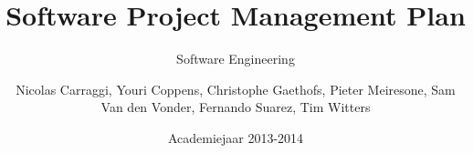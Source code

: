 \documentclass{book}
\author{Nicolas Carraggi, Youri Coppens, Christophe Gaethofs, Pieter Meiresone, Sam Van den Vonder, Fernando Suarez, Tim Witters}
\title{Software Project Management Plan}
\subtitle{Software Engineering}
\date{Academiejaar 2013-2014}
\begin{document}
\frontmatter
\makeassignment

\tableofcontents
\listoffigures
\listoftables

\mainmatter








%


\end{document}
